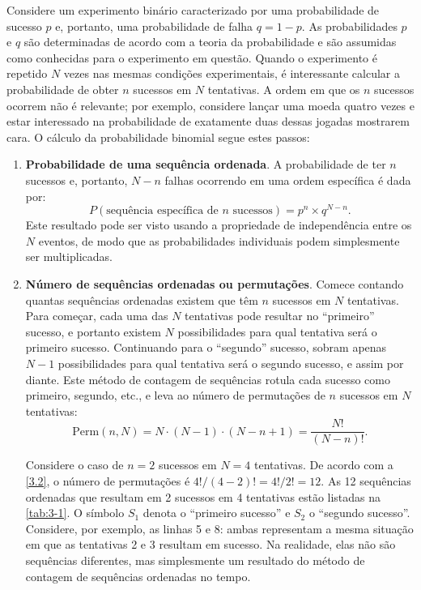 Considere um experimento binário caracterizado por uma probabilidade de sucesso $p$ e, portanto, uma probabilidade de falha $q = 1 - p$. As probabilidades $p$ e $q$ são determinadas de acordo com a teoria da probabilidade e são assumidas como conhecidas para o experimento em questão. Quando o experimento é repetido $N$ vezes nas mesmas condições experimentais, é interessante calcular a probabilidade de obter $n$ sucessos em $N$ tentativas. A ordem em que os $n$ sucessos ocorrem não é relevante; por exemplo, considere lançar uma moeda quatro vezes e estar interessado na probabilidade de exatamente duas dessas jogadas mostrarem cara. O cálculo da probabilidade binomial segue estes passos:
\begin{enumerate}[noitemsep]
\item \textbf{Probabilidade de uma sequência ordenada}. A probabilidade de ter $n$ sucessos e, portanto, $N - n$ falhas ocorrendo em uma ordem específica é dada por:
\begin{equation}\label{3.1}
P(\text{sequência específica de $n$ sucessos}) = p^n \times q^{N-n}.
\end{equation}
Este resultado pode ser visto usando a propriedade de independência entre os $N$ eventos, de modo que as probabilidades individuais podem simplesmente ser multiplicadas.

\item  \textbf{Número de sequências ordenadas ou permutações}. Comece contando quantas sequências ordenadas existem que têm $n$ sucessos em $N$ tentativas. Para começar, cada uma das $N$ tentativas pode resultar no ``primeiro'' sucesso, e portanto existem $N$ possibilidades para qual tentativa será o primeiro sucesso. Continuando para o ``segundo'' sucesso, sobram apenas $N - 1$ possibilidades para qual tentativa será o segundo sucesso, e assim por diante. Este método de contagem de sequências rotula cada sucesso como primeiro, segundo, etc., e leva ao número de permutações de $n$ sucessos em $N$ tentativas:
\begin{equation}\label{3.2}
\text{Perm}(n, N) = N \cdot (N - 1) \cdot (N - n + 1) = \dfrac{N!}{(N - n)!}.
\end{equation}

\begin{exemplo}{}{}
Considere o caso de $n = 2$ sucessos em $N = 4$ tentativas. De acordo com a \autoref{3.2}, o número de permutações é $4!/(4-2)! = 4!/2! = 12$. As 12 sequências ordenadas que resultam em 2 sucessos em 4 tentativas estão listadas na \autoref{tab:3-1}. O símbolo $S_1$ denota o ``primeiro sucesso'' e $S_2$ o ``segundo sucesso''. Considere, por exemplo, as linhas 5 e 8: ambas representam a mesma situação em que as tentativas 2 e 3 resultam em sucesso. Na realidade, elas não são sequências diferentes, mas simplesmente um resultado do método de contagem de sequências ordenadas no tempo.


\end{exemplo}
\end{enumerate}
